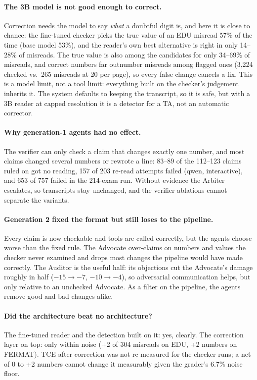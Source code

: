 \documentclass[11pt]{article}
\newcommand{\ra}{$\rightarrow$}
\begin{document}
\paragraph{The 3B model is not good enough to correct.} Correction needs the model to say \emph{what} a doubtful digit is, and here it is close to chance: the fine-tuned checker picks the true value of an EDU misread 57\% of the time (base model 53\%), and the reader's own best alternative is right in only 14--28\% of misreads. The true value is also among the candidates for only 34--69\% of misreads, and correct numbers far outnumber misreads among flagged ones (3,224 checked vs.\ 265 misreads at 20 per page), so every false change cancels a fix. This is a model limit, not a tool limit: everything built on the checker's judgement inherits it. The system defaults to keeping the transcript, so it is safe, but with a 3B reader at capped resolution it is a detector for a TA, not an automatic corrector.

\paragraph{Why generation-1 agents had no effect.} The verifier can only check a claim that changes exactly one number, and most claims changed several numbers or rewrote a line: 83--89 of the 112--123 claims ruled on got no reading, 157 of 203 re-read attempts failed (qwen, interactive), and 653 of 757 failed in the 214-exam run. Without evidence the Arbiter escalates, so transcripts stay unchanged, and the verifier ablations cannot separate the variants.

\paragraph{Generation 2 fixed the format but still loses to the pipeline.} Every claim is now checkable and tools are called correctly, but the agents choose worse than the fixed rule. The Advocate over-claims on numbers and values the checker never examined and drops most changes the pipeline would have made correctly. The Auditor is the useful half: its objections cut the Advocate's damage roughly in half ($-15$\ra$-7$, $-10$\ra$-4$), so adversarial communication helps, but only relative to an unchecked Advocate. As a filter on the pipeline, the agents remove good and bad changes alike.

\paragraph{Did the architecture beat no architecture?} The fine-tuned reader and the detection built on it: yes, clearly. The correction layer on top: only within noise (+2 of 304 misreads on EDU, +2 numbers on FERMAT). TCE after correction was not re-measured for the checker runs; a net of 0 to +2 numbers cannot change it measurably given the grader's 6.7\% noise floor.
\end{document}

